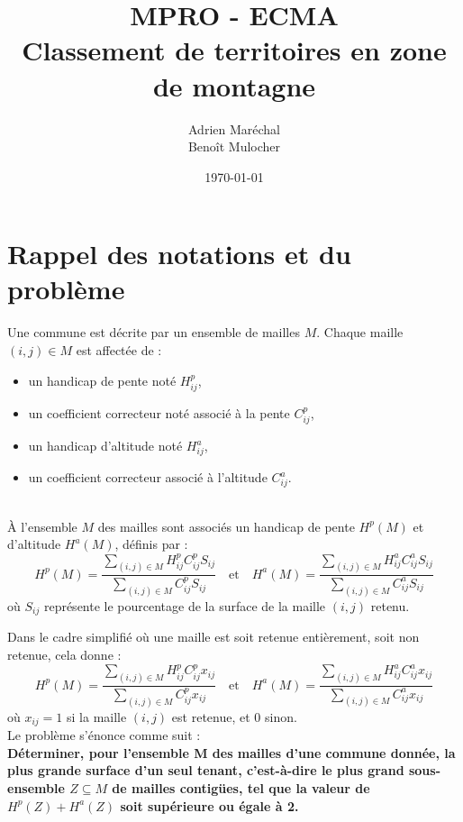 \documentclass[a4paper,11pt]{article}
\title{MPRO - ECMA\\
Classement de territoires en zone de montagne}
\author{Adrien Mar\'echal\\Benoît Mulocher}
\date{\today}
\affil{CNAM}
\begin{document}
\maketitle
\tableofcontents
\newpage



\section{Rappel des notations et du problème}


Une commune est décrite par un ensemble de mailles $M$. Chaque maille $(i,j) \in M$ est affectée de :
\begin{itemize}
	\item un handicap de pente noté $H^p_{ij}$,
	\item un coefficient correcteur noté associé à la pente $C^p_{ij}$,
	\item un handicap d'altitude noté $H^a_{ij}$,
	\item un coefficient correcteur associé à l'altitude $C^a_{ij}$.
\end{itemize}
 ~\\

\`A l'ensemble $M$ des mailles sont associés un handicap de pente $H^p(M)$ et d'altitude $H^a(M)$, définis par :
\begin{equation*}
H^p(M) = \frac{\sum_{(i,j)\in M} H^p_{ij} C^p_{ij} S_{ij}}{\sum_{(i,j)\in M} C^p_{ij} S_{ij}} \quad \text{et} \quad H^a(M) = \frac{\sum_{(i,j)\in M} H^a_{ij} C^a_{ij} S_{ij}}{\sum_{(i,j)\in M} C^a_{ij} S_{ij}}
\end{equation*}
où $S_{ij}$ représente le pourcentage de la surface de la maille $(i,j)$ retenu.

Dans le cadre simplifié où une maille est soit retenue entièrement, soit non retenue, cela donne :
\begin{equation*}
H^p(M) = \frac{\sum_{(i,j)\in M} H^p_{ij} C^p_{ij} x_{ij}}{\sum_{(i,j)\in M} C^p_{ij} x_{ij}} \quad \text{et} \quad H^a(M) = \frac{\sum_{(i,j)\in M} H^a_{ij} C^a_{ij} x_{ij}}{\sum_{(i,j)\in M} C^a_{ij} x_{ij}}
\end{equation*}
où $x_{ij} = 1$ si la maille $(i,j)$ est retenue, et $0$ sinon.\\


Le problème s'énonce comme suit :\\

\textbf{Déterminer, pour l'ensemble M des mailles d'une commune donnée, la plus grande surface d'un seul tenant, c'est-à-dire le plus grand sous-ensemble $Z\subseteq M$ de mailles contigües, tel que la valeur de $H^p(Z) + H^a(Z)$ soit supérieure ou égale à 2.}
\end{document}
